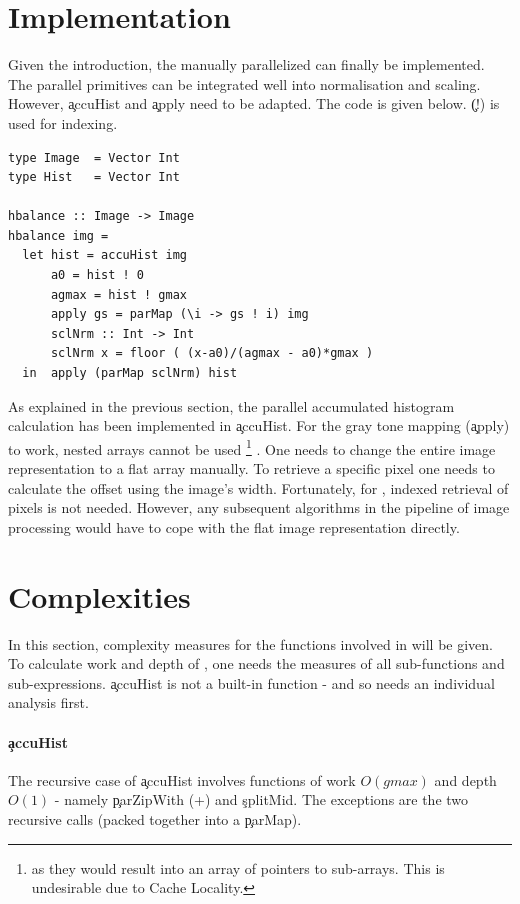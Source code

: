 \section{Implementation}
  Given the introduction, the manually parallelized \man can finally be implemented.
  The parallel primitives can be integrated
  well into normalisation and scaling.
  However, \c{accuHist} and \c{apply} need to be adapted.
  The code is given below. \c{(!)} is used for indexing.
  \begin{lstlisting}
type Image  = Vector Int
type Hist   = Vector Int

hbalance :: Image -> Image
hbalance img =
  let hist = accuHist img
      a0 = hist ! 0
      agmax = hist ! gmax
      apply gs = parMap (\i -> gs ! i) img
      sclNrm :: Int -> Int
      sclNrm x = floor ( (x-a0)/(agmax - a0)*gmax )
  in  apply (parMap sclNrm) hist
  \end{lstlisting}
  As explained in the previous section, the parallel
  accumulated histogram calculation has been implemented in \c{accuHist}.
  For the gray tone mapping (\c{apply}) to work, nested arrays cannot be used
  \footnote{as they would result into an array of pointers to sub-arrays.
  This is undesirable due to Cache Locality.}
  .
  One needs to change the entire image representation to a flat array manually.
  To retrieve a specific pixel one needs to calculate
  the offset using the image's width. Fortunately,
  for \algo, indexed retrieval of pixels is not needed.
  However, any subsequent algorithms in the pipeline of image processing
  would have to cope with the flat image representation directly.
    
\section{Complexities}
  In this section, complexity measures for the functions
  involved in \man will be given.
  To calculate work and depth of \man, one needs the measures of
  all sub-functions and sub-expressions. \c{accuHist} is
  not a built-in function - and so needs an individual analysis first.
  
  \paragraph{\c{accuHist}}
    The recursive case of \c{accuHist} involves functions
    of work $O(gmax)$ and depth $O(1)$ - 
    namely \c{parZipWith (+)} and \c{splitMid}.
    The exceptions are the two recursive calls (packed together into a
    \c{parMap}).
    
